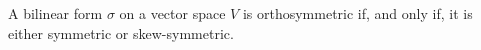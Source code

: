 A bilinear form $\sigma$ on a vector space $V$ is orthosymmetric if, and only if, it is either symmetric or skew-symmetric.
